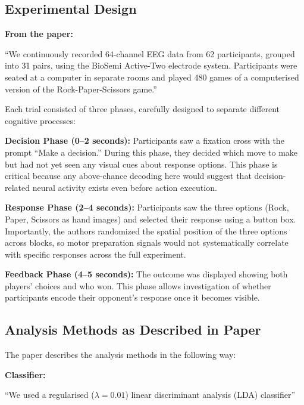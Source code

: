 \documentclass[11pt,a4paper]{article}
\begin{document}
\subsection{Experimental Design}
\label{subsec:experimental_design}

\textbf{From the paper:}
\begin{paperquote}
``We continuously recorded 64-channel EEG data from 62 participants, grouped into 31 pairs, using the BioSemi Active-Two electrode system. Participants were seated at a computer in separate rooms and played 480 games of a computerised version of the Rock-Paper-Scissors game.''
\end{paperquote}

Each trial consisted of three phases, carefully designed to separate different cognitive processes:

\textbf{Decision Phase (0--2 seconds):} Participants saw a fixation cross with the prompt ``Make a decision.'' During this phase, they decided which move to make but had not yet seen any visual cues about response options. This phase is critical because any above-chance decoding here would suggest that decision-related neural activity exists even before action execution.

\textbf{Response Phase (2--4 seconds):} Participants saw the three options (Rock, Paper, Scissors as hand images) and selected their response using a button box. Importantly, the authors randomized the spatial position of the three options across blocks, so motor preparation signals would not systematically correlate with specific responses across the full experiment.

\textbf{Feedback Phase (4--5 seconds):} The outcome was displayed showing both players' choices and who won. This phase allows investigation of whether participants encode their opponent's response once it becomes visible.

\subsection{Analysis Methods as Described in Paper}
\label{subsec:analysis_methods}

The paper describes the analysis methods in the following way:

\textbf{Classifier:}
\begin{paperquote}
``We used a regularised ($\lambda = 0.01$) linear discriminant analysis (LDA) classifier''
\end{paperquote}
\end{document}
